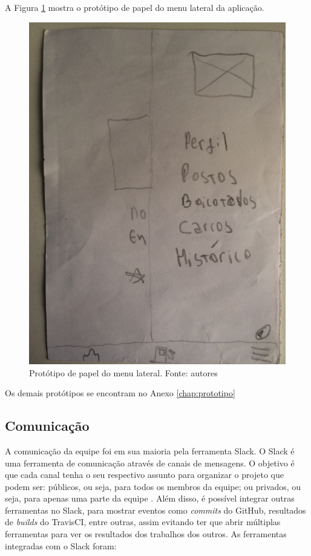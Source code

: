 A Figura \ref{img:prototipo_de_papel_menu_lateral} mostra o protótipo de papel do menu lateral da aplicação.
\begin{figure}[H]
    \centering
    \includegraphics[scale=0.1, angle=-90]{figuras/prototipo_papel_menu.jpg}
    \caption[Protótipo de papel do menu lateral]{Protótipo de papel do menu lateral. Fonte: autores}
    \label{img:prototipo_de_papel_menu_lateral}
\end{figure}
 \pagebreak

Os demais protótipos se encontram no Anexo \ref{chap:prototipo}

\subsection{Comunicação}

A comunicação da equipe foi em sua maioria pela ferramenta Slack. O Slack é uma ferramenta de comunicação através de canais de mensagens. O objetivo é que cada canal tenha o seu respectivo assunto para organizar o projeto que podem ser: públicos, ou seja, para todos os membros da equipe; ou privados, ou seja, para apenas uma parte da equipe \cite{slack}. Além disso, é possível integrar outras ferramentas no Slack, para mostrar eventos como \textit{commits} do GitHub, resultados de \textit{builds} do TravisCI, entre outras, assim evitando ter que abrir múltiplas ferramentas para ver os resultados dos trabalhos dos outros. As ferramentas integradas com o Slack foram:

